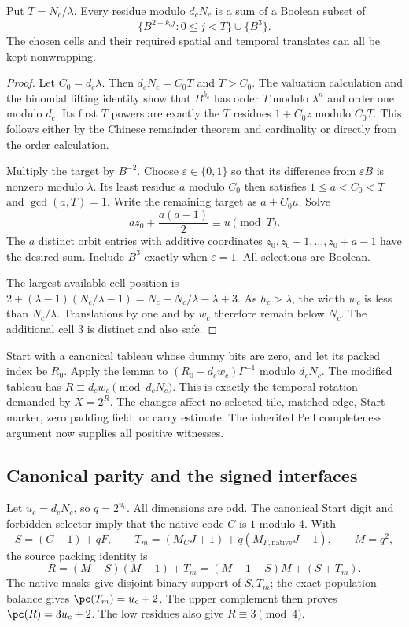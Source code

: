 \begin{lemma}
Put $T=N_c/\lambda$. Every residue modulo $d_cN_c$ is a sum of a
Boolean subset of
\[
 \{B^{2+k_cj}:0\le j<T\}\cup\{B^3\}.
\]
The chosen cells and their required spatial and temporal translates
can all be kept nonwrapping.
\end{lemma}
\begin{proof}
Let $C_0=d_c\lambda$. Then $d_cN_c=C_0T$ and $T>C_0$.
The valuation calculation and the binomial lifting identity show that
$B^{k_c}$ has order $T$ modulo $\lambda^n$ and order one modulo $d_c$.
Its first $T$ powers are exactly the $T$ residues $1+C_0z$
modulo $C_0T$. This follows either by the Chinese remainder theorem
and cardinality or directly from the order calculation.

Multiply the target by $B^{-2}$. Choose $\varepsilon\in\{0,1\}$
so that its difference from $\varepsilon B$ is nonzero modulo
$\lambda$. Its least residue $a$ modulo $C_0$ then satisfies
$1\le a<C_0<T$ and $\gcd(a,T)=1$.
Write the remaining target as $a+C_0u$. Solve
\[
 az_0+\frac{a(a-1)}2\equiv u\pmod T.
\]
The $a$ distinct orbit entries with additive coordinates
$z_0,z_0+1,\ldots,z_0+a-1$ have the desired sum. Include $B^3$
exactly when $\varepsilon=1$. All selections are Boolean.

The largest available cell position is
$2+(\lambda-1)(N_c/\lambda-1)=N_c-N_c/\lambda-\lambda+3$.
As $h_c>\lambda$, the width $w_c$ is less than $N_c/\lambda$.
Translations by one and by $w_c$ therefore remain below $N_c$.
The additional cell 3 is distinct and also safe.
\end{proof}

Start with a canonical tableau whose dummy bits are zero, and let its
packed index be $R_0$. Apply the lemma to
$(R_0-d_cw_c)\Gamma^{-1}$ modulo $d_cN_c$.
The modified tableau has $R\equiv d_cw_c\pmod{d_cN_c}$.
This is exactly the temporal rotation demanded by $X=2^R$.
The changes affect no selected tile, matched edge, Start marker, zero
padding field, or carry estimate. The inherited Pell completeness
argument now supplies all positive witnesses.

\subsection{Canonical parity and the signed interfaces}

Let $u_c=d_cN_c$, so $q=2^{u_c}$. All dimensions are odd. The
canonical Start digit and forbidden selector imply that the native
code $C$ is $1$ modulo 4. With
\[
 S=(C-1)+qF,\qquad
 T_m=(M_CJ+1)+q(M_{F,\mathrm{native}}J-1),\qquad M=q^2,
\]
the source packing identity is
\[
 R=(M-S)(M-1)+T_m=(M-1-S)M+(S+T_m).
\]
The native masks give disjoint binary support of $S,T_m$;
the exact population balance gives $\pc(T_m)=u_c+2$.
The upper complement then proves $\pc(R)=3u_c+2$.
The low residues also give $R\equiv3\pmod4$.

